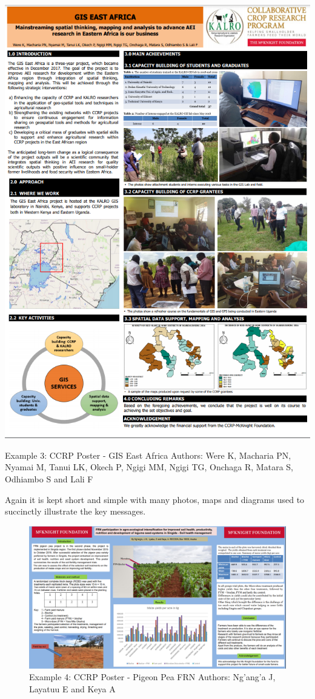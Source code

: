\documentclass[
]{book}
\begin{document}
\begin{center}\includegraphics[width=9.56in]{img/GIS East Africa Poster} \end{center}

Example 3: CCRP Poster - GIS East Africa Authors: Were K, Macharia PN, Nyamai M, Tanui LK, Okech P, Ngigi MM, Ngigi TG, Onchaga R, Matara S, Odhiambo S and Lali F

Again it is kept short and simple with many photos, maps and diagrams used to succinctly illustrate the key messages.

\begin{figure}
\centering
\includegraphics{img/Pigeon Pea FRN.png}
\caption{Example 4: CCRP Poster - Pigeon Pea FRN Authors: Ng'ang'a J, Layatuu E and Keya A}
\end{figure}
\end{document}

